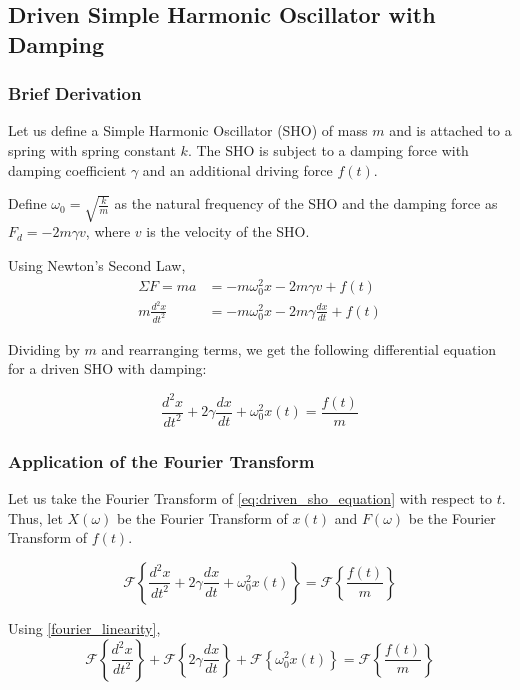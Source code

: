 \subsection{Driven Simple Harmonic Oscillator with Damping}

\subsubsection{Brief Derivation}
Let us define a Simple Harmonic Oscillator (SHO) of mass \(m\) and is attached to a spring with spring constant \(k\).
The SHO is subject to a damping force with damping coefficient \(\gamma\) and an additional driving force \(f(t)\).

\vspace{5mm}

Define \(\omega_0 = \sqrt{\frac{k}{m}}\) as the natural frequency of the SHO and the damping force as \(F_d = -2 m \gamma v\), where \(v\) is the velocity of the SHO.

\noindent
Using Newton's Second Law,
\begin{align}
    \Sigma F = ma &= -m \omega_0^2 x - 2 m \gamma v + f(t) \\
    m \frac{d^2 x}{dt^2} &= -m \omega_0^2 x - 2 m \gamma \frac{dx}{dt} + f(t)
\end{align}

\noindent
Dividing by \(m\) and rearranging terms, we get the following differential equation for a driven SHO with damping:

\begin{equation} \label{eq:driven_sho_equation}
    \frac{d^2 x}{dt^2} + 2 \gamma \frac{dx}{dt} + \omega_0^2 x(t) = \frac{f(t)}{m}
\end{equation}

\subsubsection{Application of the Fourier Transform}
\noindent
Let us take the Fourier Transform of \cref{eq:driven_sho_equation} with respect to \(t\). Thus, let \(X(\omega)\) be the Fourier Transform of \(x(t)\) and \(F(\omega)\) be the Fourier Transform of \(f(t)\).

\begin{equation}
    \mathcal{F} \left\{ \frac{d^2 x}{dt^2} + 2 \gamma \frac{dx}{dt} + \omega_0^2 x(t) \right\} = \mathcal{F} \left\{ \frac{f(t)}{m} \right\}
\end{equation}

\noindent
Using \cref{fourier_linearity},
\begin{equation} 
    \mathcal{F} \left\{ \frac{d^2 x}{dt^2} \right\} + \mathcal{F} \left\{ 2 \gamma \frac{dx}{dt} \right\} + \mathcal{F} \left\{ \omega_0^2 x(t) \right\} = \mathcal{F} \left\{ \frac{f(t)}{m} \right\}
\end{equation}

